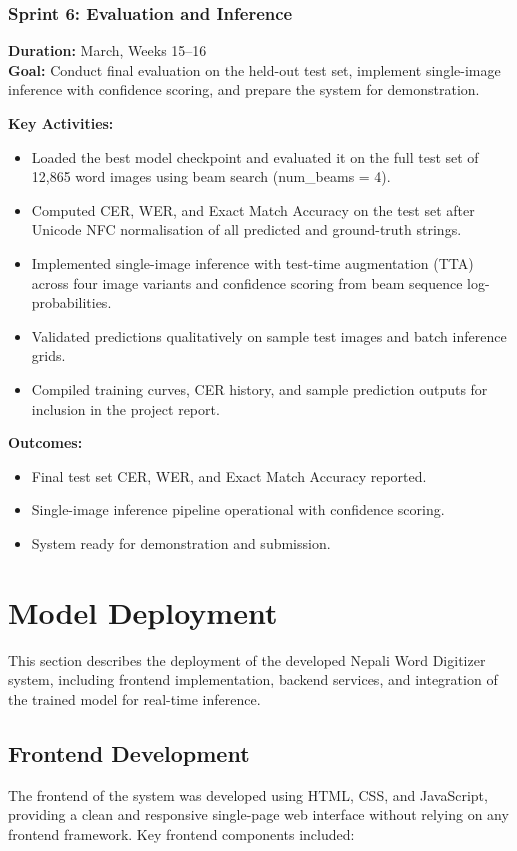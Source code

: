 \subsubsection{Sprint 6: Evaluation and Inference}
\textbf{Duration:} March, Weeks 15--16\\
\textbf{Goal:} Conduct final evaluation on the held-out test set, 
implement single-image inference with confidence scoring, and 
prepare the system for demonstration.

\textbf{Key Activities:}
\begin{itemize}
    \item Loaded the best model checkpoint and evaluated it on the 
    full test set of 12,865 word images using beam search 
    (num\_beams = 4).
    \item Computed CER, WER, and Exact Match Accuracy on the test 
    set after Unicode NFC normalisation of all predicted and 
    ground-truth strings.
    \item Implemented single-image inference with test-time 
    augmentation (TTA) across four image variants and confidence 
    scoring from beam sequence log-probabilities.
    \item Validated predictions qualitatively on sample test images 
    and batch inference grids.
    \item Compiled training curves, CER history, and sample 
    prediction outputs for inclusion in the project report.
\end{itemize}

\textbf{Outcomes:}
\begin{itemize}
    \item Final test set CER, WER, and Exact Match Accuracy 
    reported.
    \item Single-image inference pipeline operational with 
    confidence scoring.
    \item System ready for demonstration and submission.
\end{itemize}

\newpage
\section{Model Deployment}
This section describes the deployment of the developed Nepali Word Digitizer
system, including frontend implementation, backend services, and integration of the
trained model for real-time inference.
\subsection{Frontend Development}
The frontend of the system was developed using HTML, CSS, and JavaScript, 
providing a clean and responsive single-page web interface without relying 
on any frontend framework. Key frontend components included:

